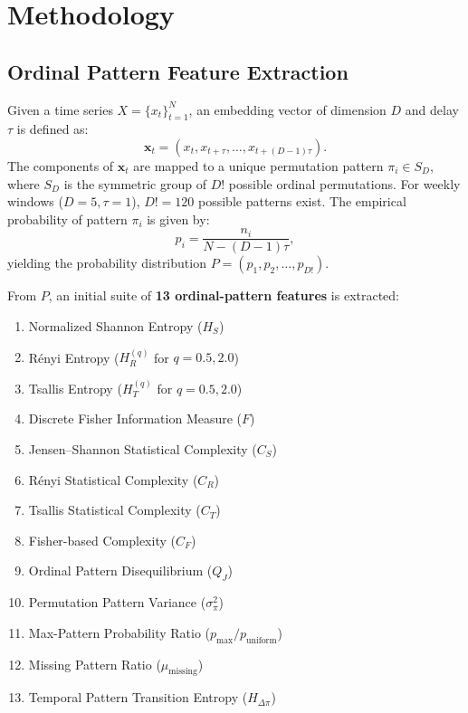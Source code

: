 \documentclass[journal]{IEEEtran}
\begin{document}
\section{Methodology}

\subsection{Ordinal Pattern Feature Extraction}
Given a time series $X = \{x_t\}_{t=1}^N$, an embedding vector of dimension $D$ and delay $\tau$ is defined as:
\begin{equation}
\mathbf{x}_t = (x_t, x_{t+\tau}, \dots, x_{t+(D-1)\tau}).
\end{equation}
The components of $\mathbf{x}_t$ are mapped to a unique permutation pattern $\pi_i \in S_D$, where $S_D$ is the symmetric group of $D!$ possible ordinal permutations. For weekly windows ($D=5, \tau=1$), $D! = 120$ possible patterns exist. The empirical probability of pattern $\pi_i$ is given by:
\begin{equation}
p_i = \frac{n_i}{N - (D-1)\tau},
\end{equation}
yielding the probability distribution $P = (p_1, p_2, \dots, p_{D!})$.

From $P$, an initial suite of \textbf{13 ordinal-pattern features} is extracted:
\begin{enumerate}
    \item Normalized Shannon Entropy ($H_S$)
    \item Rényi Entropy ($H_R^{(q)}$ for $q=0.5, 2.0$)
    \item Tsallis Entropy ($H_T^{(q)}$ for $q=0.5, 2.0$)
    \item Discrete Fisher Information Measure ($F$)
    \item Jensen--Shannon Statistical Complexity ($C_S$)
    \item Rényi Statistical Complexity ($C_R$)
    \item Tsallis Statistical Complexity ($C_T$)
    \item Fisher-based Complexity ($C_F$)
    \item Ordinal Pattern Disequilibrium ($Q_J$)
    \item Permutation Pattern Variance ($\sigma_{\pi}^2$)
    \item Max-Pattern Probability Ratio ($p_{\max} / p_{\text{uniform}}$)
    \item Missing Pattern Ratio ($\mu_{\text{missing}}$)
    \item Temporal Pattern Transition Entropy ($H_{\Delta \pi}$)
\end{enumerate}
\end{document}
